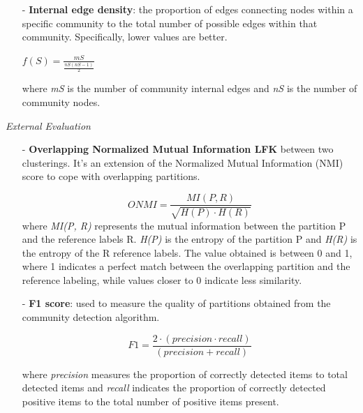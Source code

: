 \documentclass[sigchi]{acmart}
\begin{document}
\begin{itemize}
\item [-]\textbf{Internal edge density}: the proportion of edges connecting nodes within a specific community to the total number of possible edges within that community. Specifically, lower values are better. 
\vspace{4pt}

\begin{center}

$f(S) = \displaystyle\frac{mS}{\frac{nS(nS-1)}{2}}$
\end{center}

\vspace{5pt}
\begin{flushleft}
where \textit{mS} is the number of community internal edges and \textit{nS} is the number of community nodes.
 \end{flushleft}
  \end{itemize}

\vspace{10pt}

{\fontsize{10}{10}\selectfont \textit{External Evaluation }}
 

\begin{itemize}
  \item [-]\textbf{Overlapping Normalized Mutual Information LFK} between two clusterings. It's an extension of the Normalized Mutual Information (NMI) score to cope with overlapping partitions.
\begin{flushleft}
  \[
ONMI =\displaystyle\frac{{MI(P, R)}}{{\sqrt{{H(P) \cdot H(R)}}}}
\]
where \textit{MI(P, R)} represents the mutual information between the partition P and the reference labels R. \textit{H(P)} is the entropy of the partition P and \textit{H(R)} is the entropy of the R reference labels.
The value obtained is between 0 and 1, where 1 indicates a perfect match between the overlapping partition and the reference labeling, while values closer to 0 indicate less similarity.
 \end{flushleft}

\vspace{5pt}
\item [-]\textbf{F1 score}: used to measure the quality of partitions obtained from the community detection algorithm. 


\[
F1 = \displaystyle\frac{{2 \cdot (precision \cdot recall)}}{{(precision + recall)}}
\]
\begin{flushleft}
where \textit{precision} measures the proportion of correctly detected items to total detected items and \textit{recall} indicates the proportion of correctly detected positive items to the total number of positive items present.
\end{flushleft}
\end{itemize}
\end{document}
